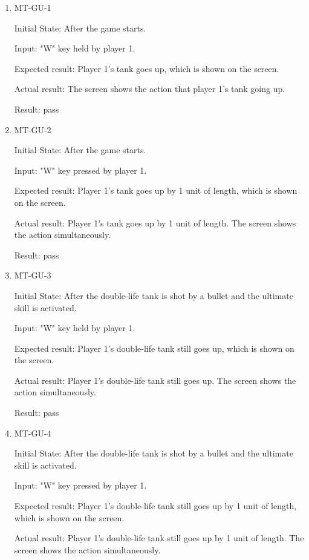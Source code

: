 \documentclass[12pt, titlepage]{article}
\begin{document}
\begin{enumerate}

\item{MT-GU-1\\}
					
Initial State: After the game starts.
					
Input: "W" key held by player 1.
					
Expected result: Player 1's tank goes up, which is shown on the screen.
					
Actual result: The screen shows the action that player 1's tank going up.

Result: pass
					
\item{MT-GU-2\\}
					
Initial State: After the game starts.
					
Input: "W" key pressed by player 1.
					
Expected result: Player 1's tank goes up by 1 unit of length, which is shown on the screen.
					
Actual result: Player 1's tank goes up by 1 unit of length. The screen shows the action simultaneously.

Result: pass

\item{MT-GU-3\\}
					
Initial State: After the double-life tank is shot by a bullet and the ultimate skill is activated.
					
Input: "W" key held by player 1.
					
Expected result: Player 1's double-life tank still goes up, which is shown on the screen.
					
Actual result: Player 1's double-life tank still goes up. The screen shows the action simultaneously.

Result: pass

\item{MT-GU-4\\}
					
Initial State: After the double-life tank is shot by a bullet and the ultimate skill is activated.
					
Input: "W" key pressed by player 1.
					
Expected result: Player 1's double-life tank still goes up by 1 unit of length, which is shown on the screen.
					
Actual result: Player 1's double-life tank still goes up by 1 unit of length. The screen shows the action simultaneously.


\end{enumerate}
\end{document}
